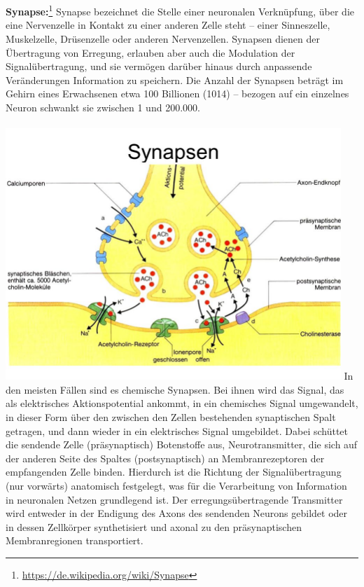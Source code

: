 \\\\
\textbf{Synapse:}\footnote{\url{https://de.wikipedia.org/wiki/Synapse}} Synapse bezeichnet die Stelle einer neuronalen Verknüpfung, über die eine Nervenzelle in Kontakt zu einer anderen Zelle steht – einer Sinneszelle, Muskelzelle, Drüsenzelle oder anderen Nervenzellen. Synapsen dienen der Übertragung von Erregung, erlauben aber auch die Modulation der Signalübertragung, und sie vermögen darüber hinaus durch anpassende Veränderungen Information zu speichern. Die Anzahl der Synapsen beträgt im Gehirn eines Erwachsenen etwa 100 Billionen (1014) – bezogen auf ein einzelnes Neuron schwankt sie zwischen 1 und 200.000.
\\\\
\includegraphics[width=0.95\textwidth]{lectures/160405/pix/synapse.jpg}
In den meisten Fällen sind es chemische Synapsen. Bei ihnen wird das Signal, das als elektrisches Aktionspotential ankommt, in ein chemisches Signal umgewandelt, in dieser Form über den zwischen den Zellen bestehenden synaptischen Spalt getragen, und dann wieder in ein elektrisches Signal umgebildet. Dabei schüttet die sendende Zelle (präsynaptisch) Botenstoffe aus, Neurotransmitter, die sich auf der anderen Seite des Spaltes (postsynaptisch) an Membranrezeptoren der empfangenden Zelle binden. Hierdurch ist die Richtung der Signalübertragung (nur vorwärts) anatomisch festgelegt, was für die Verarbeitung von Information in neuronalen Netzen grundlegend ist. Der erregungsübertragende Transmitter wird entweder in der Endigung des Axons des sendenden Neurons gebildet oder in dessen Zellkörper synthetisiert und axonal zu den präsynaptischen Membranregionen transportiert.
